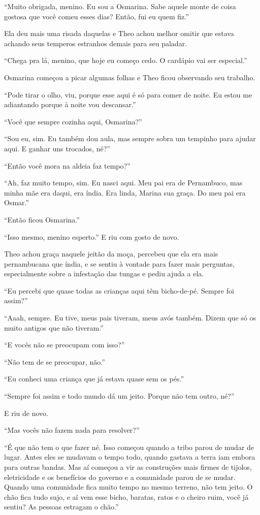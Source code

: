 ``Muito obrigada, menino. Eu sou a Osmarina. Sabe aquele monte de coisa
gostosa que você comeu esses dias? Então, fui eu quem fiz.''

Ela deu mais uma risada daquelas e Theo achou melhor omitir que estava
achando seus temperos estranhos demais para seu paladar.

``Chega pra lá, menino, que hoje eu começo cedo. O cardápio vai ser
especial.''

Osmarina começou a picar algumas folhas e Theo ficou observando seu
trabalho.

``Pode tirar o olho, viu, porque esse aqui é só para comer de noite. Eu
estou me adiantando porque à noite vou descansar.''

``Você que sempre cozinha aqui, Osmarina?''

``Sou eu, sim. Eu também dou aula, mas sempre sobra um tempinho para
ajudar aqui. E ganhar uns trocados, né?''

``Então você mora na aldeia faz tempo?''

``Ah, faz muito tempo, sim. Eu nasci aqui. Meu pai era de Pernambuco,
mas minha mãe era daqui, era índia. Era linda, Marina sua graça. Do meu
pai era Osmar.''

``Então ficou Osmarina.''

``Isso mesmo, menino esperto.'' E riu com gosto de novo.

Theo achou graça naquele jeitão da moça, percebeu que ela era mais
pernambucana que índia, e se sentiu à vontade para fazer mais perguntas,
especialmente sobre a infestação das tungas e pediu ajuda a ela.

``Eu percebi que quase todas as crianças aqui têm bicho-de-pé. Sempre
foi assim?''

``Aaah, sempre. Eu tive, meus pais tiveram, meus avós também. Dizem que
só os muito antigos que não tiveram.''

``E vocês não se preocupam com isso?''

``Não tem de se preocupar, não.''

``Eu conheci uma criança que já estava quase sem os pés.''

``Sempre foi assim e todo mundo dá um jeito. Porque não tem outro, né?''

E riu de novo.

``Mas vocês não fazem nada para resolver?''

``É que não tem o que fazer né. Isso começou quando a tribo parou de
mudar de lugar. Antes eles se mudavam o tempo todo, quando gastava a
terra iam embora para outras bandas. Mas aí começou a vir as construções
mais firmes de tijolos, eletricidade e os benefícios do governo e a
comunidade parou de se mudar. Quando uma comunidade fica muito tempo no
mesmo terreno, não tem jeito. O chão fica tudo sujo, e aí vem esse
bicho, baratas, ratos e o cheiro ruim, você já sentiu? As pessoas
estragam o chão.''

